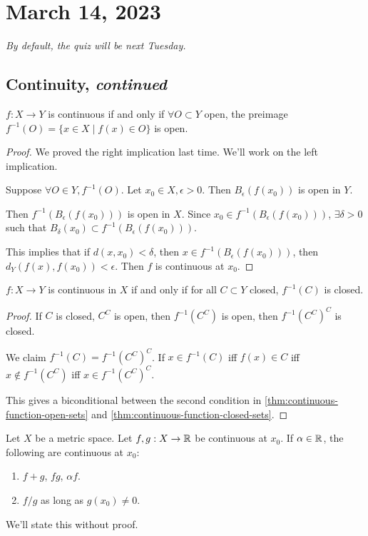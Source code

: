 \section{March 14, 2023}
\emph{By default, the quiz will be next Tuesday.}

\subsection{Continuity, \emph{continued}}

\begin{theorem}\label{thm:continuous-function-open-sets}
    $f : X\to Y$ is continuous if and only if $\forall O\subset Y$ open, the preimage $f^{-1}(O) = \{x \in X\mid f(x)\in O\}$ is open.
\end{theorem}
\begin{proof}
    We proved the right implication last time. We'll work on the left implication.

    Suppose $\forall O\in Y, f^{-1}(O)$. Let $x_0 \in X, \epsilon > 0$. Then $B_\epsilon(f(x_0))$ is open in $Y$.

    Then $f^{-1}(B_\epsilon(f(x_0)))$ is open in $X$. Since $x_0 \in f^{-1}(B_\epsilon(f(x_0)))$, $\exists \delta > 0$ such that $B_{\delta}(x_0)\subset f^{-1}(B_\epsilon(f(x_0)))$.

    This implies that if $d(x, x_0) < \delta$, then $x\in f^{-1}(B_\epsilon(f(x_0)))$, then $d_Y(f(x), f(x_0)) < \epsilon$. Then $f$ is continuous at $x_0$.
\end{proof}

\begin{corollary}\label{thm:continuous-function-closed-sets}
    $f: X\to Y$ is continuous in $X$ if and only if for all $C\subset Y$ closed, $f^{-1}(C)$ is closed.
\end{corollary}
\begin{proof}
    If $C$ is closed, $C^{C}$ is open, then $f^{-1}(C^{C})$ is open, then $f^{-1}(C^{C})^{C}$ is closed.

    We claim $f^{-1}(C) = f^{-1}(C^C)^C$. If $x\in f^{-1}(C)$ iff $f(x)\in C$ iff $x\not\in f^{-1}(C^C)$ iff $x\in f^{-1}(C^C)^C$.

    This gives a biconditional between the second condition in \cref{thm:continuous-function-open-sets} and \cref{thm:continuous-function-closed-sets}.
\end{proof}

\begin{proposition}
    Let $X$ be a metric space. Let $f,g : X\to \mathbb R$ be continuous at $x_0$. If $\alpha\in \mathbb R$, the following are continuous at $x_0$:
    \begin{enumerate}[(1)]
        \item $f+g$, $fg$, $\alpha f$.
        \item $f/g$ as long as $g(x_0)\neq 0$.
    \end{enumerate}
\end{proposition}
We'll state this without proof.

